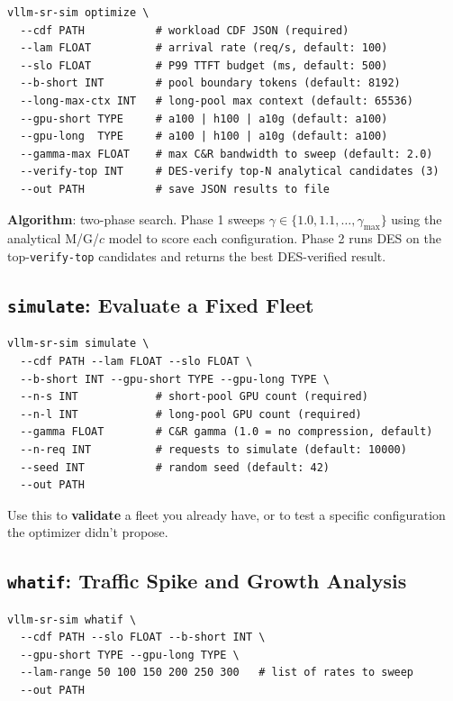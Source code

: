\documentclass[11pt,a4paper]{article}
\begin{document}
\begin{lstlisting}[style=shell]
vllm-sr-sim optimize \
  --cdf PATH           # workload CDF JSON (required)
  --lam FLOAT          # arrival rate (req/s, default: 100)
  --slo FLOAT          # P99 TTFT budget (ms, default: 500)
  --b-short INT        # pool boundary tokens (default: 8192)
  --long-max-ctx INT   # long-pool max context (default: 65536)
  --gpu-short TYPE     # a100 | h100 | a10g (default: a100)
  --gpu-long  TYPE     # a100 | h100 | a10g (default: a100)
  --gamma-max FLOAT    # max C&R bandwidth to sweep (default: 2.0)
  --verify-top INT     # DES-verify top-N analytical candidates (3)
  --out PATH           # save JSON results to file
\end{lstlisting}

\textbf{Algorithm}: two-phase search.
Phase 1 sweeps $\gamma \in \{1.0, 1.1, \ldots, \gamma_{\max}\}$ using
the analytical M/G/$c$ model to score each configuration.
Phase 2 runs DES on the top-\texttt{verify-top} candidates and
returns the best DES-verified result.

\subsection{\texttt{simulate}: Evaluate a Fixed Fleet}

\begin{lstlisting}[style=shell]
vllm-sr-sim simulate \
  --cdf PATH --lam FLOAT --slo FLOAT \
  --b-short INT --gpu-short TYPE --gpu-long TYPE \
  --n-s INT            # short-pool GPU count (required)
  --n-l INT            # long-pool GPU count (required)
  --gamma FLOAT        # C&R gamma (1.0 = no compression, default)
  --n-req INT          # requests to simulate (default: 10000)
  --seed INT           # random seed (default: 42)
  --out PATH
\end{lstlisting}

Use this to \textbf{validate} a fleet you already have, or to test a
specific configuration the optimizer didn't propose.

\subsection{\texttt{whatif}: Traffic Spike and Growth Analysis}

\begin{lstlisting}[style=shell]
vllm-sr-sim whatif \
  --cdf PATH --slo FLOAT --b-short INT \
  --gpu-short TYPE --gpu-long TYPE \
  --lam-range 50 100 150 200 250 300   # list of rates to sweep
  --out PATH
\end{lstlisting}
\end{document}
